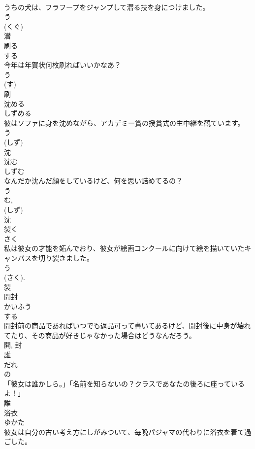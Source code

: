 \documentclass[8pt]{extreport}
\begin{document}
\begin{CJK}{UTF8}{min}
\\	うちの犬は、フラフープをジャンプして潜る技を身につけました。	
\\	う 
\\	(くぐ) 
\\	潜	
\\	刷る	
\\	する	
\\	今年は年賀状何枚刷ればいいかなあ？	
\\	う 
\\	(す) 
\\	刷	
\\	沈める	
\\	しずめる	
\\	彼はソファに身を沈めながら、アカデミー賞の授賞式の生中継を観ています。	
\\	う 
\\	(しず) 
\\	沈	
\\	沈む	
\\	しずむ	
\\	なんだか沈んだ顔をしているけど、何を思い詰めてるの？	
\\	う 
\\	む, 
\\	(しず) 
\\	沈	
\\	裂く	
\\	さく	
\\	私は彼女の才能を妬んでおり、彼女が絵画コンクールに向けて絵を描いていたキャンバスを切り裂きました。	
\\	う 
\\	(さく). 
\\	裂	
\\	開封	
\\	かいふう	
\\	する 
\\	開封前の商品であればいつでも返品可って書いてあるけど、開封後に中身が壊れてたり、その商品が好きじゃなかった場合はどうなんだろう。	
\\	開, 封	
\\	誰	
\\	だれ	
\\	の 
\\	「彼女は誰かしら。」「名前を知らないの？クラスであなたの後ろに座っているよ！」	
\\	誰	
\\	浴衣	
\\	ゆかた	
\\	彼女は自分の古い考え方にしがみついて、毎晩パジャマの代わりに浴衣を着て過ごした。	

\end{CJK}
\end{document}
